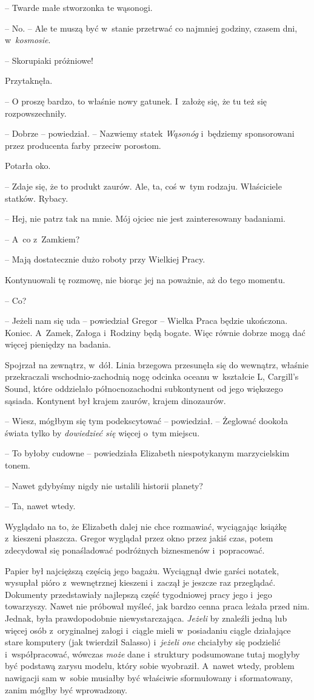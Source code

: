 \documentclass[oneside,polish,12pt,sfheadings]{mwbk}
\begin{document}
-- Twarde małe stworzonka te wąsonogi.

-- No. -- Ale te muszą być w~stanie przetrwać co najmniej godziny, czasem
dni, w~\emph{kosmosie}.

-- Skorupiaki próżniowe!

Przytaknęła. 

-- O proszę bardzo, to właśnie nowy gatunek. I~założę się,
że tu też się rozpowszechniły.

-- Dobrze -- powiedział. -- Nazwiemy statek \emph{Wąsonóg} i~będziemy
sponsorowani przez producenta farby przeciw porostom.

Potarła oko. 

-- Zdaje się, że to produkt zaurów. Ale, ta, coś w~tym
rodzaju. Właściciele statków. Rybacy.

-- Hej, nie patrz tak na mnie. Mój ojciec nie jest zainteresowany
badaniami.

-- A~co z~Zamkiem?

-- Mają dostatecznie dużo roboty przy Wielkiej Pracy.

Kontynuowali tę rozmowę, nie biorąc jej na poważnie, aż do tego momentu.

-- Co?

-- Jeżeli nam się uda -- powiedział Gregor -- Wielka Praca będzie
ukończona. Koniec. A~Zamek, Załoga i~Rodziny będą bogate. Więc równie
dobrze mogą dać więcej pieniędzy na badania.

Spojrzał na zewnątrz, w~dół. Linia brzegowa przesunęła się do wewnątrz,
właśnie przekraczali wschodnio-zachodnią nogę odcinka oceanu w~kształcie
L, Cargill's Sound, które oddzielało północnozachodni subkontynent od
jego większego sąsiada. Kontynent był krajem zaurów, krajem dinozaurów.

-- Wiesz, mógłbym się tym podekscytować -- powiedział. -- Żeglować dookoła
świata tylko by \emph{dowiedzieć się }więcej o~tym miejscu.

-- To byłoby cudowne -- powiedziała Elizabeth niespotykanym marzycielskim
tonem.

-- Nawet gdybyśmy nigdy nie ustalili historii planety?

-- Ta, nawet wtedy.

Wyglądało na to, że Elizabeth dalej nie chce rozmawiać, wyciągając
książkę z~kieszeni płaszcza. Gregor wyglądał przez okno przez jakiś
czas, potem zdecydował się ponaśladować podróżnych biznesmenów i~popracować.

Papier był najcięższą częścią jego bagażu. Wyciągnął dwie garści
notatek, wysupłał pióro z~wewnętrznej kieszeni i~zaczął je jeszcze raz
przeglądać. Dokumenty przedstawiały najlepszą część tygodniowej pracy
jego i~jego towarzyszy. Nawet nie próbował myśleć, jak bardzo cenna
praca leżała przed nim. Jednak, była prawdopodobnie niewystarczająca.
\emph{Jeżeli} by znaleźli jedną lub więcej osób z~oryginalnej załogi i~ciągle mieli w~posiadaniu ciągle działające stare komputery (jak
twierdził Salasso) i~\emph{jeżeli one } chciałyby się podzielić i~współpracować, wówczas \emph{może } dane i~struktury podsumowane tutaj
mogłyby być podstawą zarysu modelu, który sobie wyobraził. A~nawet
wtedy, problem nawigacji sam w~sobie musiałby być właściwie sformułowany
i sformatowany, zanim mógłby być wprowadzony.
\end{document}

